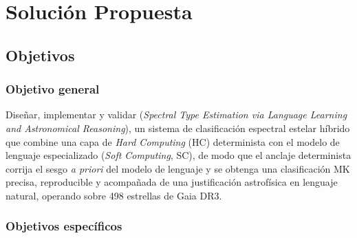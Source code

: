 \section{Solución Propuesta}
\label{sec:solucion}

\subsection{Objetivos}
\label{sec:objetivos}

\subsubsection{Objetivo general}

Diseñar, implementar y validar \STELLAR{} (\emph{Spectral Type Estimation via
Language Learning and Astronomical Reasoning}), un sistema de clasificación
espectral estelar híbrido que combine una capa de \emph{Hard Computing} (HC)
determinista con el modelo de lenguaje especializado \AstroSage{} (\emph{Soft
Computing}, SC), de modo que el anclaje determinista corrija el sesgo \emph{a
priori} del modelo de lenguaje y se obtenga una clasificación MK precisa,
reproducible y acompañada de una justificación astrofísica en lenguaje natural,
operando sobre \num{498} estrellas de Gaia DR3.

\subsubsection{Objetivos específicos}

